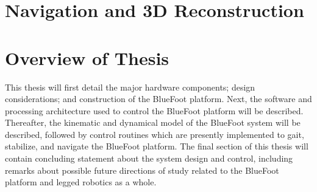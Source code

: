 		\section{Navigation and 3D Reconstruction}


		\section{Overview of Thesis}

		This thesis will first detail the major hardware components; design considerations; and construction of the BlueFoot platform. Next, the software and processing architecture used to control the BlueFoot platform will be described. Thereafter, the kinematic and dynamical model of the BlueFoot system will be described, followed by control routines which are presently implemented to gait, stabilize, and navigate the BlueFoot platform. The final section of this thesis will contain concluding statement about the system design and control, including remarks about possible future directions of study related to the BlueFoot platform and legged robotics as a whole.

